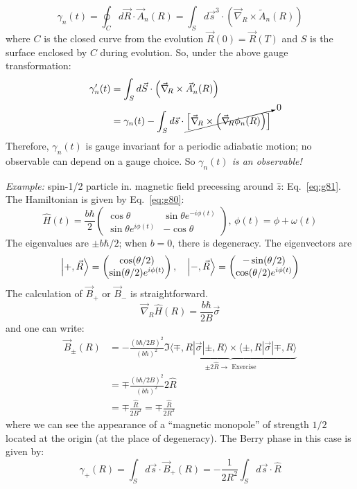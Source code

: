 \documentclass[12pt]{article}
\newcommand{\be}{\begin{equation}}
\newcommand{\ee}{\end{equation}}
\begin{document}
\be
\gamma_{n}(t)=\oint_{C} d \vec{R} \cdot \vec{A}_{n}(R)=\int_{S} d \vec{s}^{3} \cdot\left(\vec{\nabla}_{\!R}  \times \tilde{A}_{n}(R)\right)
\ee
where 
$C$ is the closed curve from the
evolution $\vec{R}(0)=\vec{R}(T)$
and
$S$ is the surface enclosed
by $C$ during evolution.
So, under the above gauge transformation:
\be
\begin{aligned}
\gamma_{n}^{\prime}(t)
&=\int_{S} d \vec{S} \cdot\left(\vec{\nabla}_{\!R}  \times \vec{A}_{n}^{\prime}(R)\right)\\
&=\gamma_{n}(t)-\int_{S} d \vec{s} \cdot
\cancelto{0}{\left[\vec{\nabla}_{\!R}  \times\left(\vec{\nabla}_{\!R}  \phi_{n}(R)\right)\right]}
\end{aligned}
\ee
Therefore, $\gamma_{n}(t)$ is gauge invariant for a
periodic adiabatic motion; no observable can
depend on a gauge choice. So
\emph{$\gamma_n(t)$ is an observable!}


\setcounter{equation}{143}

\emph{Example:} spin-1/2 particle in. magnetic field
precessing around $\hat{z}$: Eq.~\eqref{eq:g81}.
The Hamiltonian is  given by Eq.~\eqref{eq:g80}:
\be
\hat{H}(t) = 
\frac{b\hbar}{2}
\begin{pmatrix}
 \cos\theta & \sin\theta e^{-i\phi(t)}\\
\sin\theta e^{ i\phi(t)} & -\cos\theta
\end{pmatrix},\,
\phi(t) = \phi+\omega(t)
\ee
The eigenvalues are $\pm b \hbar / 2$; when $b=0$, there is
degeneracy. The eigenvectors are
\[
\ket{+,\vec{R}} = \begin{pmatrix} \cos(\theta/2)\\\sin(\theta/2)e^{ i\phi(t)}\end{pmatrix},\quad
\ket{-,\vec{R}} = \begin{pmatrix} -\sin(\theta/2)\\\cos(\theta/2)e^{ i\phi(t)}\end{pmatrix}
\]
The calculation of $\vec{B}_+$ or $\vec{B}_-$ is straightforward.
\be
\vec{\nabla}_{\!R}  \hat{H}(R)=\frac{b \hbar}{2 B} \vec{\sigma}
\ee
and one can write:
\be
\begin{aligned}
\vec{B}_{\pm}(R)
&=-\frac{(b \hbar / 2 B)^{2}}{(b \hbar)^{2}} 
\underbrace{\Im \langle\mp, R|\vec{\sigma}| \pm, R \rangle \times
    \langle\pm, R|\vec{\sigma}| \mp, R \rangle}%
    _{\pm 2\hat{R}\to\text{ Exercise}}\\
&=\mp \frac{(b \hbar / 2 B)^{2}}{(b \hbar)^{2}} 2 \hat{R}\\
&=\mp \frac{\hat{R}}{2 B^{2}}=\mp \frac{\hat{R}}{2 R^{2}}
\end{aligned}
\ee
where we can see the appearance of a ``magnetic monopole'' of strength $1 / 2$ located at the
origin (at the place of degeneracy).
The Berry phase in this case is given by:
\be
\gamma_{+}(R)=\int_{S} d \vec{s} \cdot \vec{B}_{+}(R)=-\frac{1}{2 R^{2}} \int_{S} d \vec{s} \cdot \hat{R}
\ee
\end{document}
